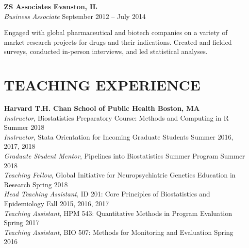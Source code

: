 \documentclass[12pt]{article}
\begin{document}

\textbf{ZS Associates \hfill \hfill Evanston, IL} \\
\textit{Business Associate} \hfill \hfill September 2012 -- July 2014 
\begin{addmargin}[1em]{2em} {\small Engaged with global pharmaceutical and biotech companies on a variety of market research projects for drugs and their indications. Created and fielded surveys, conducted in-person interviews, and led statistical analyses.} \end{addmargin}

\section*{\textbf{{\large T}{EACHING} {\large E}{XPERIENCE}}}
\textbf{Harvard T.H. Chan School of Public Health \hfill \hfill Boston, MA} \\
\textit{Instructor}, Biostatistics Preparatory Course: Methods and Computing in R \hfill \hfill Summer 2018 \\
\textit{Instructor}, Stata Orientation for Incoming Graduate Students \hfill \hfill	Summer 2016, 2017, 2018\\
\textit{Graduate Student Mentor}, Pipelines into Biostatistics Summer Program \hfill \hfill Summer 2018 \\
\textit{Teaching Fellow}, Global Initiative for Neuropsychiatric Genetics Education in Research \hfill \hfill Spring 2018 \\
\textit{Head Teaching Assistant}, ID 201: Core Principles of Biostatistics and Epidemiology \hfill \hfill Fall 2015, 2016, 2017 \\
\textit{Teaching Assistant}, HPM 543: Quantitative Methods in Program Evaluation \hfill \hfill Spring 2017 \\
\textit{Teaching Assistant}, BIO 507: Methods for Monitoring and Evaluation \hfill \hfill Spring 2016 \\
\end{document}
